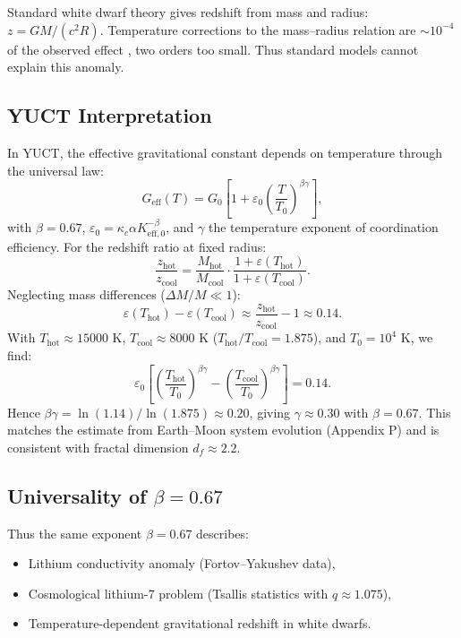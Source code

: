 \documentclass[12pt,a4paper]{article}
\theoremstyle{remark}
\newcommand{\df}{d_{\!f}}
\newcommand{\kappac}{\kappa_c}
\newcommand{\alp}{\alpha}
\newcommand{\eps}{\varepsilon}
\begin{document}
	Standard white dwarf theory gives redshift from mass and radius: \(z = GM/(c^2 R)\). Temperature corrections to the mass–radius relation are \(\sim 10^{-4}\) of the observed effect \cite{Fontaine2001}, two orders too small. Thus standard models cannot explain this anomaly.
	
	\subsection{YUCT Interpretation}
	\label{subsec:wd-yuct-interp}
	
	In YUCT, the effective gravitational constant depends on temperature through the universal law:
	\[
	G_{\mathrm{eff}}(T) = G_0\left[1 + \eps_0 \left(\frac{T}{T_0}\right)^{\beta\gamma}\right],
	\]
	with \(\beta = 0.67\), \(\eps_0 = \kappac \alp K_{\mathrm{eff},0}^{-\beta}\), and \(\gamma\) the temperature exponent of coordination efficiency. For the redshift ratio at fixed radius:
	\[
	\frac{z_{\mathrm{hot}}}{z_{\mathrm{cool}}} = \frac{M_{\mathrm{hot}}}{M_{\mathrm{cool}}} \cdot \frac{1 + \eps(T_{\mathrm{hot}})}{1 + \eps(T_{\mathrm{cool}})}.
	\]
	Neglecting mass differences (\(\Delta M/M \ll 1\)):
	\[
	\eps(T_{\mathrm{hot}}) - \eps(T_{\mathrm{cool}}) \approx \frac{z_{\mathrm{hot}}}{z_{\mathrm{cool}}} - 1 \approx 0.14.
	\]
	With \(T_{\mathrm{hot}} \approx 15000\) K, \(T_{\mathrm{cool}} \approx 8000\) K (\(T_{\mathrm{hot}}/T_{\mathrm{cool}} = 1.875\)), and \(T_0 = 10^4\) K, we find:
	\[
	\eps_0 \left[\left(\frac{T_{\mathrm{hot}}}{T_0}\right)^{\beta\gamma} - \left(\frac{T_{\mathrm{cool}}}{T_0}\right)^{\beta\gamma}\right] = 0.14.
	\]
	Hence \(\beta\gamma = \ln(1.14)/\ln(1.875) \approx 0.20\), giving \(\gamma \approx 0.30\) with \(\beta = 0.67\). This matches the estimate from Earth–Moon system evolution \cite{Lantink2022, Farhat2022} (Appendix P) and is consistent with fractal dimension \(\df \approx 2.2\).
	
	\subsection{Universality of \(\beta = 0.67\)}
	\label{subsec:beta-universality}
	
	Thus the same exponent \(\beta = 0.67\) describes:
	\begin{itemize}
		\item Lithium conductivity anomaly (Fortov–Yakushev data),
		\item Cosmological lithium-7 problem (Tsallis statistics with \(q \approx 1.075\)),
		\item Temperature-dependent gravitational redshift in white dwarfs.
	\end{itemize}
	
\end{document}
